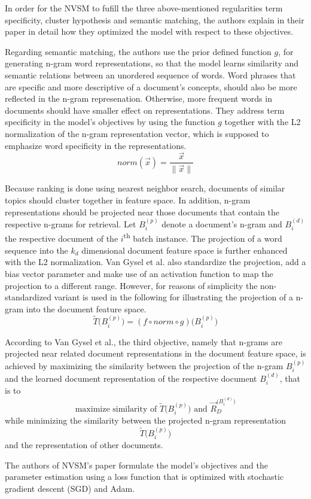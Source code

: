 In order for the NVSM to fufill the three above-mentioned regularities
    term specificity, cluster hypothesis and semantic matching,
    the authors explain in their paper in detail how they optimized 
    the model with respect to these objectives.

Regarding semantic matching, the authors use the prior defined function $g$, 
    for generating n-gram word representations,
    so that the model learns similarity and semantic relations
    between an unordered sequence of words.
Word phrases that are specific and more descriptive of a document's concepts, 
    should also be more reflected in the n-gram represenation.
Otherwise, more frequent words in documents should have smaller effect on 
    representations.
They address term specificity in the model's objectives by using the 
    function $g$ together with the L2 normalization 
    of the n-gram representation vector, which is supposed to 
    emphasize word specificity in the representations.
\[
norm(\vec{x}) = \frac{\vec{x}}{\|\vec{x}\|}
\]

Because ranking is done using nearest neighbor search, 
    documents of similar topics should cluster together in feature space.
In addition, n-gram representations should be projected near those 
    documents that contain the respective n-grams for retrieval.
Let $B_i^{(p)}$ denote a document's n-gram and $B_i^{(d)}$ the respective document 
    of the $i$\textsuperscript{th} batch instance.
The projection of a word sequence into the $k_d$ dimensional document
    feature space is further enhanced with the L2 normalization.
Van Gysel et al. also standardize the projection, add a bias vector parameter
    and make use of an activation function to map the projection to a different 
    range.
However, for reasons of simplicity the non-standardized variant is used in the 
    following for illustrating the projection of a n-gram into the document 
    feature space.
\[
\widetilde{T}\Big(B_i^{(p)}\Big) = (f \circ norm \circ g) \Big(B_i^{(p)} \Big)
\]

According to Van Gysel et al., the third objective, 
    namely that n-grams are projected near related document representations 
    in the document feature space, is achieved by maximizing the similarity between 
    the projection of the n-gram $B_i^{(p)}$ and the learned 
    document representation of the respective document $B_i^{(d)}$,
    that is to
    \[
    \textrm{maximize similarity of }\widetilde{T}\Big(B_i^{(p)}\Big) \textrm{ and } \vec{R}_D^{\big(B_i^{(d)}\big)}
    \]
    while minimizing the similarity between the projected n-gram representation
    \[
    \widetilde{T}\Big(B_i^{(p)}\Big)
    \]
    and the representation of other documents.

The authors of NVSM's paper formulate the model's objectives and
    the parameter estimation using a loss function 
    that is optimized with stochastic gradient descent (SGD)
    and Adam. \cite{van-gysel:2017:neural-vector-spaces}



